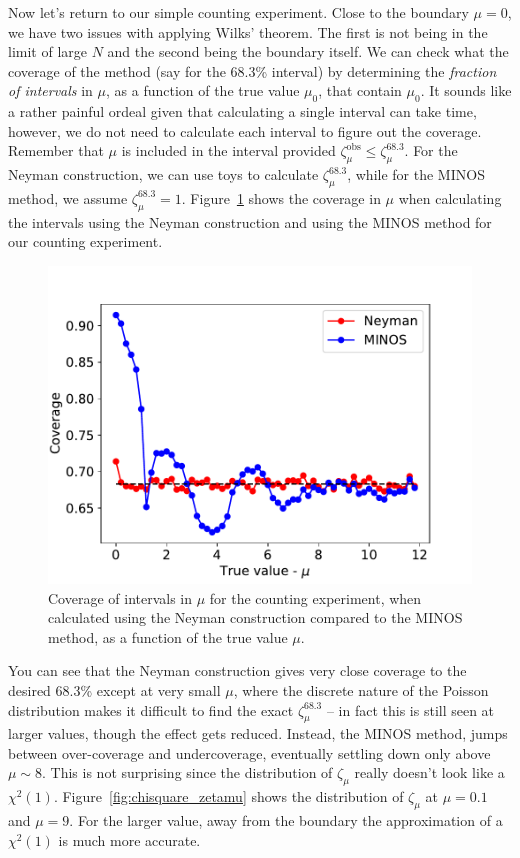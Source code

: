 Now let's return to our simple counting experiment. Close to the boundary $\mu=0$, we have two issues with applying Wilks' theorem. The first is not being in the limit of large $N$ and the second being the boundary itself. We can check what the coverage of the method (say for the 68.3\% interval) by determining the \emph{fraction of intervals} in $\mu$, as a function of the true value $\mu_0$, that contain $\mu_{0}$. It sounds like a rather painful ordeal given that calculating a single interval can take time, however, we do not need to calculate each interval to figure out the coverage. Remember that $\mu$ is included in the interval provided $\zeta^{\mathrm{obs}}_{\mu}\leq\zeta^{68.3}_{\mu}$. For the Neyman construction, we can use toys to calculate $\zeta^{68.3}_{\mu}$, while for the \textsf{MINOS} method, we assume $\zeta^{68.3}_{\mu}=1$. Figure~\ref{fig:coverage} shows the coverage in $\mu$ when calculating the intervals using the Neyman construction and using the \textsf{MINOS} method for our counting experiment.  
\begin{figure}[hbt!]
    \centering
    \includegraphics{figures/Intervals/coverage_example.pdf}
    \caption{Coverage of intervals in $\mu$ for the counting experiment, when calculated using the Neyman construction compared to the \textsf{MINOS} method, as a function of the true value $\mu$.}
    \label{fig:coverage}
\end{figure}
You can see that the Neyman construction gives very close coverage to the desired 68.3\% except at very small $\mu$, where the discrete nature of the Poisson distribution makes it difficult to find the exact $\zeta^{68.3}_{\mu}$ -- in fact this is still seen at larger values, though the effect gets reduced. Instead, the \textsf{MINOS} method, jumps between over-coverage and undercoverage, eventually settling down only above $\mu\sim 8$. This is not surprising since the distribution of $\zeta_{\mu}$ really doesn't look like a $\chi^{2}(1)$. Figure~\ref{fig:chisquare_zetamu} shows the distribution of $\zeta_{\mu}$ at $\mu=0.1$ and $\mu=9$. For the larger value, away from the boundary the approximation of a $\chi^{2}(1)$ is much more accurate. 
